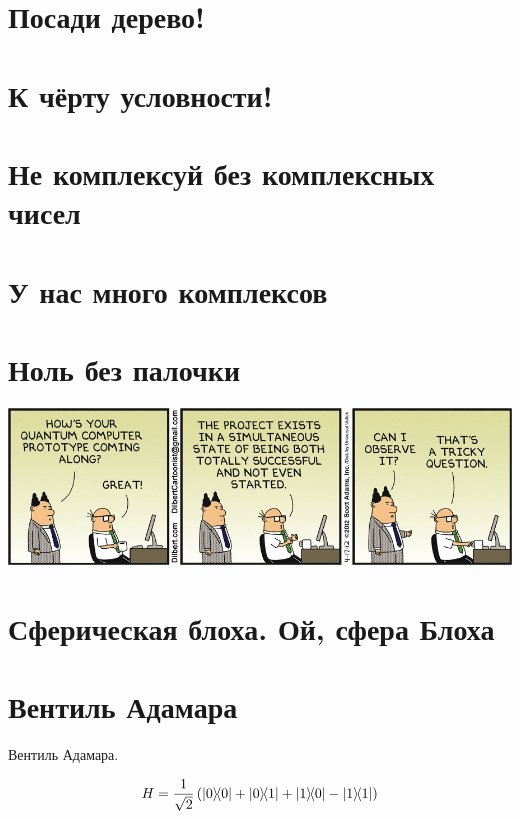 \documentclass[12pt]{article}
\begin{document}
\tableofcontents{}

\section{Посади дерево!}

\section{К чёрту условности!}

\section{Не комплексуй без комплексных чисел}

\section{У нас много комплексов}

\section{Ноль без палочки}


\begin{minipage}{0.8\textwidth}
\includegraphics[width=\textwidth]{image/dilbert_quantum_prototype.png}
\end{minipage}



\section{Сферическая блоха. Ой, сфера Блоха}

\section{Вентиль Адамара}

Вентиль Адамара.

\[
H = \frac{1}{\sqrt{2}}\left( \ketbra{0}{0} + \ketbra{0}{1} + \ketbra{1}{0} - \ketbra{1}{1} \right)
\]
\end{document}
